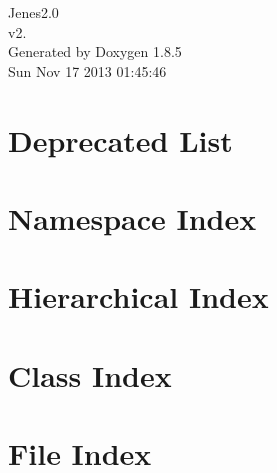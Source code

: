 \documentclass[twoside]{book}
\newcommand{\clearemptydoublepage}{%
  \newpage{\pagestyle{empty}\cleardoublepage}%
}
\begin{document}
\hypersetup{pageanchor=false}
\begin{titlepage}
\vspace*{7cm}
\begin{center}%
{\Large Jenes2.0 \\[1ex]\large v2. }\\
\vspace*{1cm}
{\large Generated by Doxygen 1.8.5}\\
\vspace*{0.5cm}
{\small Sun Nov 17 2013 01:45:46}\\
\end{center}
\end{titlepage}
\clearemptydoublepage
\tableofcontents
\clearemptydoublepage
{}
\hypersetup{pageanchor=true}

\chapter{Deprecated List}
\label{deprecated}
\hypertarget{deprecated}{}

\chapter{Namespace Index}

\chapter{Hierarchical Index}

\chapter{Class Index}

\chapter{File Index}

\end{document}
